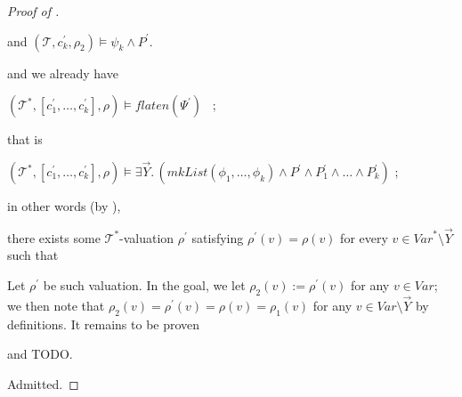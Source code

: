 \begin{proof}[Proof of ]
\begin{enumerate}
\begin{proofenv}
        and $(\mathcal{T}, c_k^\prime, \rho_2) \vDash \psi_k \land P^\prime$.
    \end{proofenv}
    and we already have
    \begin{proofenv}
        $(\mathcal{T}^*, [c^\prime_1,\ldots,c^\prime_k], \rho) \vDash \mathit{flaten}(\Psi^\prime)$ \, ;
    \end{proofenv}
    that is
    \begin{proofenv}
        $(\mathcal{T}^*, [c^\prime_1,\ldots,c^\prime_k], \rho) \vDash \exists \vec{Y}.\, (\mathit{mkList}(\phi_1,\ldots,\phi_k) \land P^\prime \land P^\prime_1 \land \ldots \land P^\prime_k)$ ;
    \end{proofenv}
    in other words (by ),
    \begin{proofenv}
        there exists some $\mathcal{T}^*$-valuation $\rho^\prime$
        satisfying $\rho^\prime(v) = \rho(v)$ for every $v \in \mathit{Var}^* \setminus \vec{Y}$
        such that
    \end{proofenv}
    Let $\rho^\prime$ be such valuation.
    In the goal, we let $\rho_2(v) := \rho^\prime(v)$ for any $v \in \mathit{Var}$;
    we then note that $\rho_2(v) = \rho^\prime(v) =  \rho(v) =  \rho_1(v)$ for any $v \in \mathit{Var} \setminus \vec{Y}$ by definitions.
    It remains to be proven
    
    and 
    TODO.
    
\end{enumerate}

Admitted.
\end{proof}


